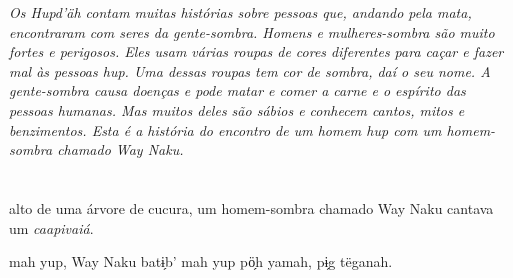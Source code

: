 \vspace*{\fill}
\textit{Os Hupd'äh contam muitas histórias sobre pessoas que, andando pela mata, encontraram com seres da gente-sombra. Homens e mulheres-sombra são muito fortes e perigosos. Eles usam várias roupas de cores diferentes para caçar e fazer mal às pessoas hup. Uma dessas roupas tem cor de sombra, daí o seu nome. A gente-sombra causa doenças e pode matar e comer a carne e o espírito das pessoas humanas. Mas muitos deles são sábios e conhecem cantos, mitos e benzimentos. Esta é a história do encontro de um homem hup com um homem-sombra chamado Way Naku.}
\vspace*{\fill}


\chapter*{}
\mbox{}\vspace*{\fill}

\begingroup\raggedright\setlength{\linewidth}{.6\linewidth}


 alto de uma árvore de
cucura, um homem-sombra
chamado Way Naku cantava
um \textit{caapivaiá}.

\vspace{2em}

 mah yup, Way Naku
batɨ̗b’ mah yup pö̗h yamah,
pɨ̗g tëganah.

\vspace*{\fill}

\pagebreak

